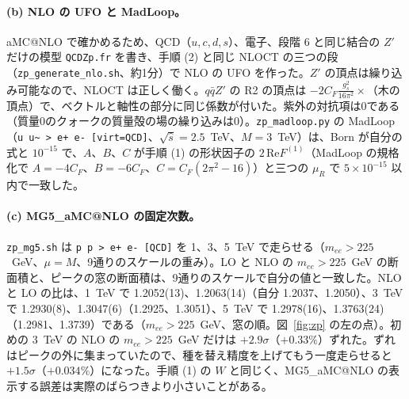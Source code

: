 \documentclass[a4paper,10pt]{ltjsarticle}
\makeatletter
\newcommand{\MGaMC}{MG5\_aMC@NLO}
\makeatother
\begin{document}
\paragraph{(b) NLO の UFO と MadLoop。}aMC@NLO で確かめるため、QCD（$u,c,d,s$）、電子、段階 6 と同じ結合の $Z'$ だけの模型 \texttt{QCDZp.fr} を書き、手順 (2) と同じ NLOCT の三つの段（\texttt{zp\_generate\_nlo.sh}、約1分）で NLO の UFO を作った。$Z'$ の頂点は繰り込み可能なので、NLOCT は正しく働く。$q\bar qZ'$ の R2 の頂点は $-2C_F\frac{g_s^2}{16\pi^2}\times$（木の頂点）で、ベクトルと軸性の部分に同じ係数が付いた。紫外の対抗項は0である（質量0のクォークの質量殻の場の繰り込みは0）。\texttt{zp\_madloop.py} の MadLoop（\texttt{u u\textasciitilde{} > e+ e- [virt=QCD]}、$\sqrt{\hat s}=2.5$~TeV、$M=3$~TeV）は、Born が自分の式と $10^{-15}$ で、$A$、$B$、$C$ が手順 (1) の形状因子の $2\,\mathrm{Re}F^{(1)}$（MadLoop の規格化で $A=-4C_F$、$B=-6C_F$、$C=C_F(2\pi^2-16)$）と三つの $\mu_R$ で $5\times10^{-15}$ 以内で一致した。

\paragraph{(c) \MGaMC{} の固定次数。}\texttt{zp\_mg5.sh} は \texttt{p p > e+ e- [QCD]} を 1、3、5~TeV で走らせる（$m_{ee}>225$~GeV、$\mu=M$、9通りのスケールの重み）。LO と NLO の $m_{ee}>225$~GeV の断面積と、ピークの窓の断面積は、9通りのスケールで自分の値と一致した。NLO と LO の比は、1~TeV で 1.2052(13)、1.2063(14)（自分 1.2037、1.2050）、3~TeV で 1.2930(8)、1.3047(6)（1.2925、1.3051）、5~TeV で 1.2978(16)、1.3763(24)（1.2981、1.3739）である（$m_{ee}>225$~GeV、窓の順。図~\ref{fig:zp} の左の点）。初めの 3~TeV の NLO の $m_{ee}>225$~GeV だけは $+2.9\sigma$（$+0.33\%$）ずれた。ずれはピークの外に集まっていたので、種を替え精度を上げてもう一度走らせると $+1.5\sigma$（$+0.034\%$）になった。手順 (1) の $W$ と同じく、\MGaMC{} の表示する誤差は実際のばらつきより小さいことがある。
\end{document}
